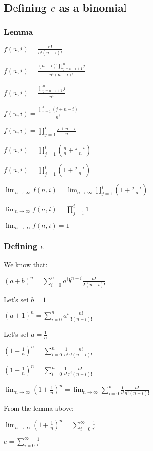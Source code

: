 
\subsection{Defining \(e\) as a binomial}

\subsubsection{Lemma}

$f(n,i)=\frac{n!}{n^i(n-i)!}$

$f(n,i)=\frac{(n-i)!\prod_{j=n-i+1}^nj}{n^i(n-i)!}$

$f(n,i)=\frac{\prod_{j=n-i+1}^nj}{n^i}$

$f(n,i)=\frac{\prod_{j=1}^i(j+n-i)}{n^i}$

$f(n,i)=\prod_{j=1}^i\frac{j+n-i}{n}$

$f(n,i)=\prod_{j=1}^i(\frac{n}{n}+\frac{j-i}{n})$

$f(n,i)=\prod_{j=1}^i(1+\frac{j-i}{n})$

$\lim_{n\rightarrow \infty }f(n,i)=\lim_{n\rightarrow \infty }\prod_{j=1}^i(1+\frac{j-i}{n})$

$\lim_{n\rightarrow \infty }f(n,i)=\prod_{j=1}^i1$

$\lim_{n\rightarrow \infty }f(n,i)=1$

\subsubsection{Defining \(e\)}

We know that:

$(a+b)^n=\sum^n_{i=0} a^i b^{n-i} \frac{n!}{i!(n-i)!}$

Let's set \(b=1\)

$(a+1)^n=\sum^n_{i=0} a^i \frac{n!}{i!(n-i)!}$

Let's set \(a=\frac{1}{n}\)

$(1+\frac{1}{n})^{n}=\sum^{n}_{i=0} \frac{1}{n^i} \frac{n!}{i!(n-i)!}$

$(1+\frac{1}{n})^{n}=\sum^{n}_{i=0} \frac{1}{i!} \frac{n!}{n^i(n-i)!}$

$\lim_{n\rightarrow \infty }(1+\frac{1}{n})^{n}=\lim_{n\rightarrow \infty }\sum^{n}_{i=0} \frac{1}{i!} \frac{n!}{n^i(n-i)!}$

From the lemma above:

$\lim_{n\rightarrow \infty }(1+\frac{1}{n})^{n}=\sum^{\infty }_{i=0} \frac{1}{i!}$

\(e=\sum^{\infty }_{i=0} \frac{1}{i!}\)


